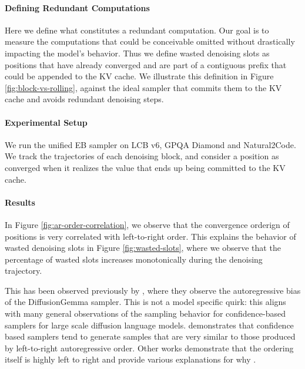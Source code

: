 

\paragraph{Defining Redundant Computations}
Here we define what constitutes a redundant computation.
Our goal is to measure the computations that could be conceivable omitted without drastically impacting the model's behavior.
Thus we define wasted denoising slots as positions that have already converged and are part of a contiguous prefix that could be appended to the KV cache.
We illustrate this definition in Figure \ref{fig:block-vs-rolling}, against the ideal sampler that commits them to the KV cache and avoids redundant denoising steps.



\paragraph{Experimental Setup}
We run the unified EB sampler on LCB v6, GPQA Diamond and Natural2Code. We track the trajectories of each denoising block, and consider a position as converged when it realizes the value that ends up being committed to the KV cache.

\paragraph{Results}
In Figure \ref{fig:ar-order-correlation}, we observe that the convergence orderign of positions is very correlated with left-to-right order. This explains the behavior of wasted denoising slots in Figure \ref{fig:wasted-slots}, where we observe that the percentage of wasted slots increases monotonically during the denoising trajectory.  

This has been observed previously by \citep{asaria2026neither}, where they observe the autoregressive bias of the DiffusionGemma sampler. 
This is not a model specific quirk: this aligns with many general observations of the sampling behavior for confidence-based samplers for large scale diffusion language models. 
\citet{kim2026interface} demonstrates that confidence based samplers tend to generate samples that are very similar to those produced by left-to-right autoregressive order. 
Other works demonstrate that the ordering itself is highly left to right and provide various explanations for why \citep{gong2026diffucoder, lu2026adablock, yao2026decoding}.

